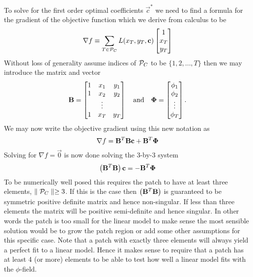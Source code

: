 \documentclass[preprint,nocopyrightspace]{sigplanconf}
\begin{document}
To solve for the first order optimal coefficients $\vec c^*$ we need
to find a formula for the gradient of the objective function which we
derive from calculus to be
\begin{equation}
  \nabla f 
  \equiv
  \sum_{T \in \mathcal{P}_C}
  L(  x_T, y_T, \mathbf{c}  )
  \begin{bmatrix}
    1 \\
    x_T \\
    y_T
  \end{bmatrix}
\end{equation}
Without loss of generality assume indices of $\mathcal{P}_C$ to be
$\{1,2,\ldots, T\}$ then we may introduce the matrix and vector
\begin{equation}
  \mathbf{B}  =
  \begin{bmatrix}
    1 & x_1 & y_1 \\
    1 & x_2 & y_2 \\
    & \vdots & \\
    1 & x_T & y_T
  \end{bmatrix}
\quad\text{and}\quad
\mathbf{\Phi} 
=
\begin{bmatrix}
  \phi_1 \\
  \phi_2 \\
  \vdots\\
  \phi_T 
\end{bmatrix}.
\end{equation}
We may now write the objective gradient using this new notation as
\begin{equation}
  \nabla f = \mathbf{B} ^T \mathbf{B}  \mathbf{c}  + \mathbf{B} ^T \mathbf{\Phi}  
\end{equation}
Solving for $\nabla f = \vec 0$ is now done solving the 3-by-3 system
\begin{equation}
  \left( \mathbf{B} ^T \mathbf{B}  \right) \mathbf{c}  =  -  \mathbf{B} ^T \mathbf{\Phi}  
\end{equation}
To be numerically well posed this requires the patch to have at least three elements, $\parallel {\mathcal{P}_C} \parallel \geq 3$. If this is the case then $\left( \mathbf{B} ^T \mathbf{B} 
\right)$ is guaranteed to be symmetric positive definite matrix and
hence non-singular. If less than three elements the matrix will be
positive semi-definite and hence singular. In other words the patch is
too small for the linear model to make sense the most sensible
solution would be to grow the patch region or add some other
assumptions for this specific case. Note that a patch with exactly
three elements will always yield a perfect fit to a linear
model. Hence it makes sense to require that a patch has at least 4 (or more)
elements to be able to test how well a linear model fits with the $\phi$-field.
\end{document}
